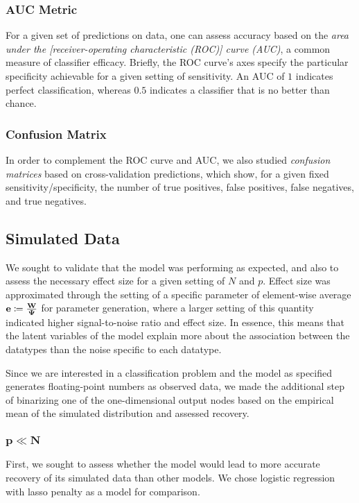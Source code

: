 \subsubsection{AUC Metric}
For a given set of predictions on data, one can assess accuracy based on the \textit{area under the [receiver-operating characteristic (ROC)] curve (AUC)}, a common measure of classifier efficacy\cite{friedman_elements_2001}. Briefly, the ROC curve's axes specify the particular specificity achievable for a given setting of sensitivity. An AUC of $1$ indicates perfect classification, whereas $0.5$ indicates a classifier that is no better than chance.

\subsubsection{Confusion Matrix}
In order to complement the ROC curve and AUC, we also studied \textit{confusion matrices} based on cross-validation predictions, which show, for a given fixed sensitivity/specificity, the number of true positives, false positives, false negatives, and true negatives.

\subsection{Simulated Data}

We sought to validate that the model was performing as expected, and also to assess the necessary effect size for a given setting of $N$ and $p$. Effect size was approximated through the setting of a specific parameter of element-wise average $\mathbf{e} \coloneqq \frac{\bold{W}}{\bold{\Psi}}$ for parameter generation, where a larger setting of this quantity indicated higher signal-to-noise ratio and effect size. In essence, this means that the latent variables of the model explain more about the association between the datatypes than the noise specific to each datatype.

Since we are interested in a classification problem and the model as specified generates floating-point numbers as observed data, we made the additional step of binarizing one of the one-dimensional output nodes based on the empirical mean of the simulated distribution and assessed recovery.


\subsubsection{$\mathbf{p \ll N}$}

First, we sought to assess whether the model would lead to more accurate recovery of its simulated data than other models. We chose logistic regression with lasso penalty as a model for comparison.

